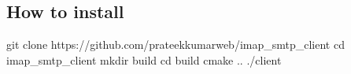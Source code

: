 \subsection*{How to install}


\begin{DoxyCode}
git clone https://github.com/prateekkumarweb/imap\_smtp\_client
cd imap\_smtp\_client
mkdir build
cd build
cmake ..
./client
\end{DoxyCode}
 